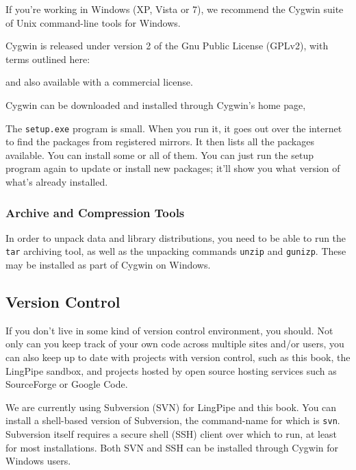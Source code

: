 If you're working in Windows (XP, Vista or 7), we recommend the 
Cygwin suite of Unix command-line tools for Windows.  

Cygwin is released under version 2 of the Gnu Public License (GPLv2), with
terms outlined here:
%
\begin{quote}
\end{quote}
%
and also available with a commercial license.

Cygwin can be downloaded and installed through Cygwin's home page,
%
\begin{quote}
\end{quote}
%
The {\tt setup.exe} program is small.  When you run it, it goes out
over the internet to find the packages from registered mirrors.  It
then lists all the packages available.  You can install some or all of
them.  You can just run the setup program again to update or install
new packages; it'll show you what version of what's already installed.

\subsubsection{Archive and Compression Tools}

In order to unpack data and library distributions, you need to be able
to run the {\tt tar} archiving tool, as well as the unpacking commands
{\tt unzip} and {\tt gunizp}.  These may be installed as part of
Cygwin on Windows.


\subsection{Version Control}

If you don't live in some kind of version control environment, you should.
Not only can you keep track of your own code across multiple sites and/or
users, you can also keep up to date with projects with version control,
such as this book, the LingPipe sandbox, and projects hosted by open
source hosting services such as SourceForge or Google Code.

We are currently using Subversion (SVN) for LingPipe and this book.
You can install a shell-based version of Subversion, the command-name
for which is {\tt svn}.  Subversion itself requires a secure shell
(SSH) client over which to run, at least for most installations.  Both
SVN and SSH can be installed through Cygwin for Windows users.

